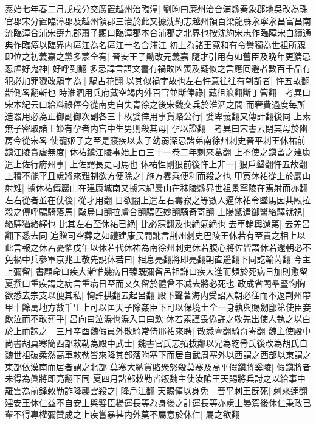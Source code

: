 泰始七年春二月戊戌分交廣置越州治臨漳|{
	劉昫曰廉州治合浦縣秦象郡地吳改為珠官郡宋分置臨漳郡及越州領郡三治於此又據沈約志越州領百梁龍蘇永寧永昌富昌南流臨漳合浦宋夀九郡蕭子顯曰臨漳郡本合浦郡之北界也按沈約宋志作臨障宋白續通典作臨瘴以臨界内瘴江為名瘴江一名合浦江}
初上為諸王寛和有令譽獨為世祖所親即位之初義嘉之黨多蒙全宥|{
	晉安王子勛改元義嘉}
隨才引用有如舊臣及晩年更猜忌忍虐好鬼神|{
	好呼到翻}
多忌諱言語文書有禍敗凶喪及疑似之言應囘避者數百千品有犯必加罪戮改騧字為|{
	騧古花翻}
以其似禍字故也左右忤意往往有刳斮者|{
	忤五故翻斮側畧翻斬也}
時淮泗用兵府藏空竭内外百官並斷俸祿|{
	藏徂浪翻斷丁管翻　考異曰宋本紀云曰給料祿俸今從南史自失青徐之後宋魏交兵於淮泗之間}
而奢費過度每所造器用必為正御副御次副各三十枚嬖倖用事貨賂公行|{
	嬖卑義翻又傳計翻後同}
上素無子密取諸王姬有孕者内宫中生男則殺其母|{
	孕以證翻　考異曰宋書云閉其母於幽房今從宋畧}
使寵姬子之至是寢疾以太子幼弱深忌諸弟南徐州刺史晉平刺王休祐前鎭江陵貪虐無度|{
	休祐鎭江陵事始上百三十一卷二年刺來葛翻}
上不使之鎭留之建康遣上佐行府州事|{
	上佐謂長史司馬也}
休祐性剛狠前後忤上非一|{
	狠戶墾翻忤五故翻}
上積不能平且慮將來難制欲方便除之|{
	施方畧乘便利而殺之也}
甲寅休祐從上於巖山射雉|{
	據休祐傳巖山在建康城南又據宋紀巖山在秣陵縣界世祖景寧陵在焉射而亦翻}
左右從者並在仗後|{
	從才用翻}
日欲闇上遣左右壽寂之等數人逼休祐令墜馬因共敺拉殺之傳呼驃騎落馬|{
	敺烏口翻拉盧合翻驃匹妙翻騎奇寄翻}
上陽驚遣御醫絡驛就視|{
	絡驛猶絡繹也}
比其左右至休祐已絶|{
	比必寐翻及也絶氣絶也}
去車輪輿還第|{
	去羌呂翻下悉去同}
追贈司空葬之如禮建康民間訛言荆州刺史巴陵王休若有至貴之相上以此言報之休若憂懼戊午以休若代休祐為南徐州刺史休若腹心將佐皆謂休若還朝必不免禍中兵參軍京兆王敬先說休若曰|{
	相息亮翻將即亮翻朝直遥翻下同訖輸芮翻}
今主上彌留|{
	書顧命曰疾大漸惟幾病日臻既彌留呂祖謙曰疾大進而頻於死病日加則愈留夏撰曰重疾謂之病言重病日至而又久留於體曾不减去將必死也}
政成省閤羣豎恟恟欲悉去宗支以便其私|{
	恟許拱翻去起呂翻}
殿下聲著海内受詔入朝必往而不返荆州帶甲十餘萬地方數千里上可以匡天子除姦臣下可以保境土全一身孰與賜劒邸第使臣妾飲泣而不敢葬乎|{
	呂向曰泣淚也淚入口曰飲}
休若素謹畏偽許之敬先出使人執之以白於上而誅之　三月辛酉魏假員外散騎常侍邢祐來聘|{
	散悉亶翻騎奇寄翻}
魏主使殿中尚書胡莫寒簡西部敕勒為殿中武士|{
	魏書官氏志拓拔鄰以兄為紇骨氏後改為胡氏自魏世祖破柔然高車敕勒皆來降其部落附塞下而居自武周塞外以西謂之西部以東謂之東部依漠南而居者謂之北部}
莫寒大納貨賂衆怒殺莫寒及高平假鎭將奚陵|{
	假鎭將者未得為眞將即亮翻下同}
夏四月諸部敕勒皆叛魏主使汝隂王天賜將兵討之以給事中羅雲為前鋒敕勒詐降襲雲殺之|{
	降戶江翻}
天賜僅以身免　晉平刺王旣死|{
	刺來逹翻}
建安王休仁益不自安上與嬖臣楊運長等為身後之計運長等亦慮上晏駕後休仁秉政已輩不得專權彌贊成之上疾嘗暴甚内外莫不屬意於休仁|{
	屬之欲翻}
